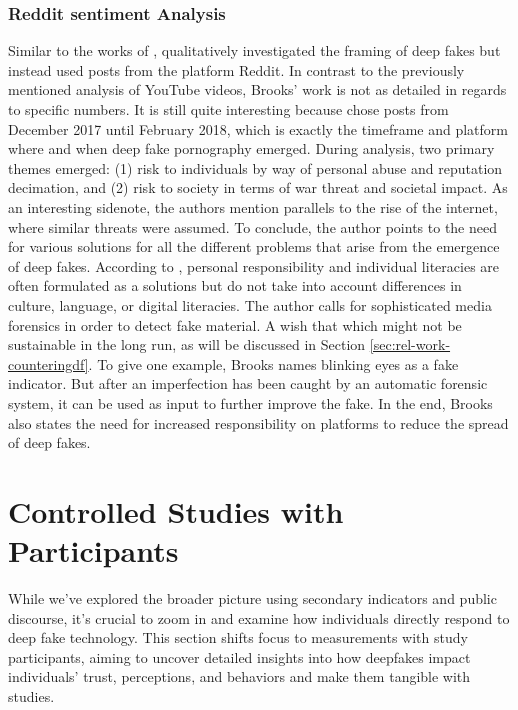 \documentclass[
  a4paper,  %
  twoside,  %
  bibliography=totoc,
  headsepline,
  cleardoublepage=empty,
  parskip=half,
  draft=false
]{scrbook}
\begin{document}
\subsubsection*{Reddit sentiment Analysis}
Similar to the works of \citeauthor{leeBelieveNotBelieve2021}, \citeauthor{brooksPopularDiscourseDeepfakes2021} qualitatively investigated the framing of deep fakes but instead used posts from the platform Reddit. In contrast to the previously mentioned analysis of YouTube videos, Brooks' work is not as detailed in regards to specific numbers. It is still quite interesting because \citeauthor{brooksPopularDiscourseDeepfakes2021} chose posts from December 2017 until February 2018, which is exactly the timeframe and platform where and when deep fake pornography emerged. During analysis, two primary themes emerged: (1) risk to individuals by way of personal abuse and reputation decimation, and (2) risk to society in terms of war threat and societal impact. As an interesting sidenote, the authors mention parallels to the rise of the internet, where similar threats were assumed. To conclude, the author points to the need for various solutions for all the different problems that arise from the emergence of deep fakes. According to \cite{brooksPopularDiscourseDeepfakes2021}, personal responsibility and individual literacies are often formulated as a solutions but do not take into account differences in culture, language, or digital literacies. The author calls for sophisticated media forensics in order to detect fake material. A wish that which might not be sustainable in the long run, as will be discussed in Section \ref{sec:rel-work-counteringdf}. To give one example, Brooks names blinking eyes as a fake indicator. But after an imperfection has been caught by an automatic forensic system, it can be used as input to further improve the fake. In the end, Brooks also states the need for increased responsibility on platforms to reduce the spread of deep fakes.

\section{Controlled Studies with Participants}
\label{sec:rel-studypart}

While we've explored the broader picture using secondary indicators and public discourse, it's crucial to zoom in and examine how individuals directly respond to deep fake technology. This section shifts focus to measurements with study participants, aiming to uncover detailed insights into how deepfakes impact individuals' trust, perceptions, and behaviors and make them tangible with studies.
\end{document}
